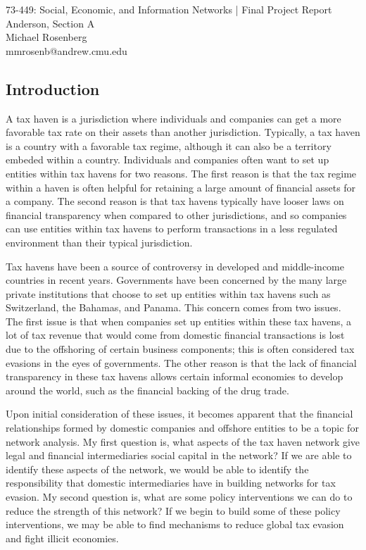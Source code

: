 \documentclass[11pt]{article}
\makeatletter
\newcommand{\myname}{Michael Rosenberg}
\newcommand{\myandrew}{mmrosenb@andrew.cmu.edu}
\newcommand{\mycourse}{73-449: Social, Economic, and Information Networks}
\newcommand{\myhwname}{| Final Project Report}
\newcommand{\myrecitation}{Anderson, Section A}
\newcommand{\myteammates}{}
\makeatother
\begin{document}
\begin{center}
    {\Large \mycourse} {\Large \myhwname} \\
    \myrecitation \\
    \myname \\
    \myandrew \\
\end{center}

\subsection{Introduction}

A tax haven is a jurisdiction where individuals and companies can get a
more favorable tax rate on their assets than another
jurisdiction. Typically, a tax haven is a country with a
favorable tax regime, although it can also be a territory embeded within a
country. Individuals and companies often want to set up entities within tax
havens for two reasons. The first reason is that the tax regime within
a haven is often helpful for retaining a large amount of financial assets
for a company. The second reason is that tax havens typically have looser
laws on financial transparency when compared to other jurisdictions, and so
companies can use entities within tax havens to perform
transactions in a less regulated environment than their typical jurisdiction.

Tax havens have been a source of controversy in developed and middle-income
countries in recent years. Governments have been concerned by the many large
private institutions that choose to set up entities within tax havens such as
Switzerland, the Bahamas, and Panama. This concern comes from two issues. The
first issue is that when companies set up entities within these tax havens, a
lot of tax revenue that would come from domestic financial transactions is lost
due to the offshoring of certain business components; this is often considered
tax evasions in the eyes of governments. The other reason is that the lack of
financial transparency in these tax havens allows certain informal economies to
develop around the world, such as the financial backing of the drug trade.

Upon initial consideration of these issues, it becomes apparent that
the financial relationships formed by
domestic companies and offshore entities to be a topic for network analysis. 
My first question is, what aspects of the tax haven
network give legal and financial intermediaries social capital in the network?
If we are able to identify these aspects of the network, we would be able to
identify the responsibility that domestic intermediaries have in building
networks for tax evasion. My second question is, what are some policy
interventions we can do to reduce the strength of this network? If we begin to
build some of these policy interventions, we may be able to find mechanisms to
reduce global tax evasion and fight illicit economies.
\end{document}
